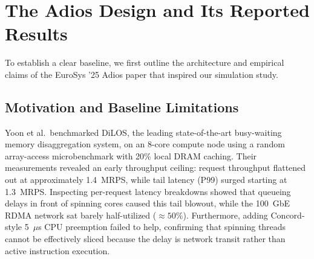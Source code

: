 \section{The Adios Design and Its Reported Results}
\label{sec:adios}
To establish a clear baseline, we first outline the architecture and empirical claims of the EuroSys '25 Adios paper \cite{adios} that inspired our simulation study.

\subsection{Motivation and Baseline Limitations}
Yoon et al.\ benchmarked DiLOS, the leading state-of-the-art busy-waiting memory disaggregation system, on an 8-core compute node using a random array-access microbenchmark with 20\% local DRAM caching. Their measurements revealed an early throughput ceiling: request throughput flattened out at approximately 1.4~MRPS, while tail latency (P99) surged starting at 1.3~MRPS. Inspecting per-request latency breakdowns showed that queueing delays in front of spinning cores caused this tail blowout, while the 100~GbE RDMA network sat barely half-utilized ($\approx 50\%$). Furthermore, adding Concord-style 5~$\mu$s CPU preemption failed to help, confirming that spinning threads cannot be effectively sliced because the delay is network transit rather than active instruction execution.

